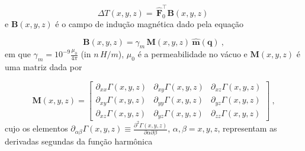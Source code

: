 \begin{equation}
\Delta T(x, y, z) = \, \hat{\mathbf{F}}_{0}^{\top} \mathbf{B}(x, y, z) \: 
\label{eq:tfanomaly}
\end{equation}
e $\mathbf{B}(x,y,z)$ é o campo de indução magnética dado pela equação 

\begin{equation}
\mathbf{B}(x,y,z) = \gamma_{m} \, \mathbf{M}(x, y, z) \: 
\hat{\mathbf{m}}(\mathbf{q}) \: ,
\label{eq:inducao_fonte}
\end{equation} 
em que $\gamma_{m} = 10^{-9} \frac{\mu_{0}}{4 \pi}$ (in $n \, H / m $), $\mu_{0}$ é a permeabilidade no vácuo e $\mathbf{M}(x, y, z)$ é uma matriz dada por 

\begin{equation}
	\mathbf{M}(x, y, z) = \begin{bmatrix}
		\partial_{xx} \Gamma(x, y, z) & 
		\partial_{xy} \Gamma(x, y, z) &
		\partial_{xz} \Gamma(x, y, z) \\
		\partial_{xy} \Gamma(x, y, z) & 
		\partial_{yy} \Gamma(x, y, z) &
		\partial_{yz} \Gamma(x, y, z) \\
		\partial_{xz} \Gamma(x, y, z) & 
		\partial_{yz} \Gamma(x, y, z) &
		\partial_{zz} \Gamma(x, y, z)
	\end{bmatrix} \: ,
	\label{eq:M-matrix}
\end{equation}
cujo os elementos $\partial_{\alpha\beta} \Gamma(x, y, z) \equiv 
\frac{\partial^{2} \Gamma(x, y, z)}{\partial \alpha \partial \beta}$, 
$\alpha, \beta = x, y, z$, representam as derivadas segundas da função harmônica 

